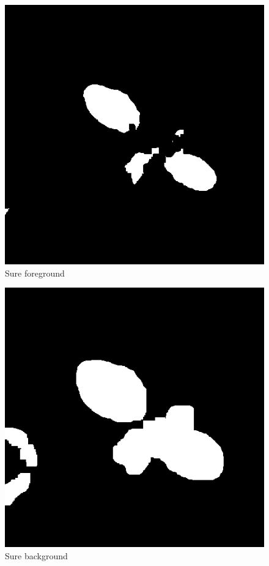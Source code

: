 \documentclass[10pt]{article}
\begin{document}
\begin{figure}[H]
\caption{Sure foreground}
\includegraphics[width=\textwidth]{../example/sure_fg}
\end{figure}
\begin{figure}[H]
\caption{Sure background}
\includegraphics[width=\textwidth]{../example/sure_bg}
\end{figure}
\end{document}
